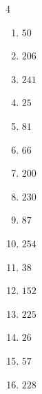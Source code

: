 \begin{multicols}{4}
\begin{enumerate}
  \item $50$


  \item $206$


  \item $241$


  \item $25$


  \item $81$


  \item $66$


  \item $200$


\columnbreak %

  \item $230$


  \item $87$


  \item $254$


  \item $38$


  \item $152$


  \item $225$


  \item $26$


  \item $57$


  \item $228$


\end{enumerate}
\end{multicols}
